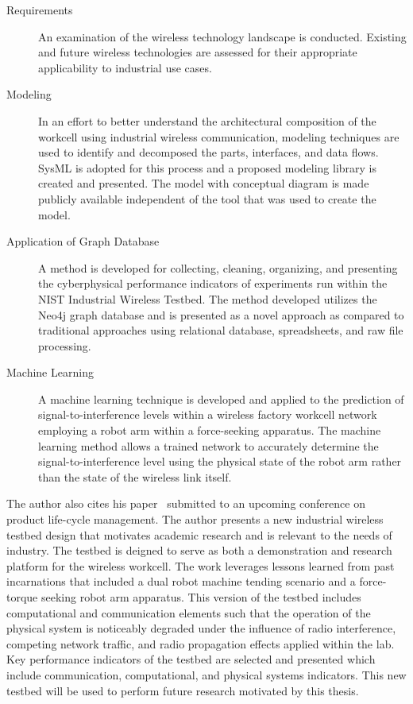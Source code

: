 \documentclass[12pt]{article}
\begin{document}
		\begin{description}
			
			\item[Requirements] \cite{CandellRW2017} \cite{Montgomery2019} \cite{Candell2018.IWSGuide} \cite{ieeeMagazine2018} An examination of the wireless technology landscape is conducted.  Existing and future wireless technologies are assessed for their appropriate applicability to industrial use cases.
			
			\item[Modeling] \cite{Candell2019ASR.SYSML} \cite{Candell2018SysML.JRES} In an effort to better understand the architectural composition of the workcell using industrial wireless communication, modeling techniques are used to identify and decomposed the parts, interfaces, and data flows.  SysML is adopted for this process and a proposed modeling library is created and presented.  The model with conceptual diagram is made publicly available independent of the tool that was used to create the model.
			
			\item[Application of Graph Database] \cite{CandellISIT2020.Conf} A method is developed for collecting, cleaning, organizing, and presenting the cyberphysical performance indicators of experiments run within the NIST Industrial Wireless Testbed. The method developed utilizes the Neo4j graph database and is presented as a novel approach as compared to traditional approaches using relational database, spreadsheets, and raw file processing.
			
			\item[Machine Learning] \cite{CandellISIE2019.Conf} \cite{CandellIJAMT2020.Jrnl} A machine learning technique is developed and applied to the prediction of signal-to-interference levels within a wireless factory workcell network employing a robot arm within a force-seeking apparatus.  The machine learning method allows a trained network to accurately determine the signal-to-interference level using the physical state of the robot arm rather than the state of the wireless link itself.
			
		\end{description}
	
		The author also cites his paper~\cite{Candell.PLMConf2020} submitted to an upcoming conference on product life-cycle management.  The author presents a new industrial wireless testbed design that motivates academic research and is relevant to the needs of industry. The testbed is deigned to serve as both a demonstration and research platform for the wireless workcell. The work leverages lessons learned from past incarnations that included a dual robot machine tending scenario and a force-torque seeking robot arm apparatus. This version of the testbed includes computational and communication elements such that the operation of the physical system is noticeably degraded under the influence of radio interference, competing network traffic, and radio propagation effects applied within the lab. Key performance indicators of the testbed are selected and presented which include communication, computational, and physical systems indicators. This new testbed will be used to perform future research motivated by this thesis.
		
\end{document}
